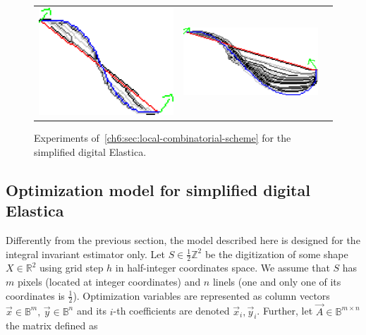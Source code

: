 \begin{figure}[]
\begin{tabular}{ccc}
\includegraphics[scale=0.25]{figures/chapter5/fixed-orientations/selastica/len_pen_0.01/curve-2/summary.pdf} &
\includegraphics[scale=0.25]{figures/chapter5/fixed-orientations/selastica/len_pen_0.01/curve-3/summary.pdf}
\end{tabular}
\caption{Experiments of~\cref{ch6:sec:local-combinatorial-scheme} for the simplified digital Elastica.}
\label{fig:simplified-elastica}
\end{figure}


\subsection{Optimization model for simplified digital Elastica}
\label{ch6:subsec:optimization-model-simplified-digital-elastica}

Differently from the previous section, the model described here is designed for the integral invariant estimator only. Let $S \in \frac{1}{2}\mathbb{Z}^2$ be the digitization of some shape $X \in \mathbb{R}^2$ using grid step $h$ in half-integer coordinates space. We assume that $S$ has $m$ pixels (located at integer coordinates) and $n$ linels (one and only one of its coordinates is $\frac{1}{2}$). Optimization variables are represented as column vectors $\vec{x} \in \mathbb{B}^{m},\, \vec{y} \in \mathbb{B}^{n}$ and its $i$-th coefficients are denoted  $\vec{x}_i,\vec{y}_i$.  Further, let $\vec{A} \in \mathbb{B}^{m\times n}$ the matrix defined as

